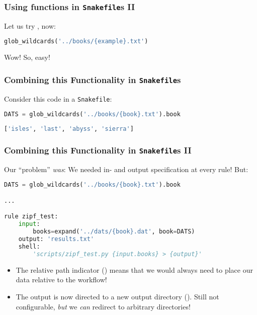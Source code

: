 \begin{frame}[fragile]
  \frametitle{Using functions in \texttt{Snakefile}s II}
  \pause
  \pause
  Let us try , now:
  \begin{lstlisting}[language=Python,style=Python]
glob_wildcards('../books/{example}.txt')
  \end{lstlisting}
  \pause
  Wow! So, easy!
\end{frame}

\begin{frame}[fragile]
  \frametitle{Combining this Functionality in \texttt{Snakefile}s}
  Consider this code in a \texttt{Snakefile}:
  \begin{lstlisting}[language=Python,style=Python]
DATS = glob_wildcards('../books/{book}.txt').book
  \end{lstlisting}
  \pause
  \begin{lstlisting}[language=Python,style=Python]
['isles', 'last', 'abyss', 'sierra']
  \end{lstlisting}
\end{frame}

\begingroup
{}
\begin{frame}[fragile]
  \frametitle{Combining this Functionality in \texttt{Snakefile}s II}\footnotesize
  \vspace{-0.5em}
  Our ``problem'' \emph{was}: We needed in- and output specification at every rule! But:
  \begin{lstlisting}[language=Python,style=Python,basicstyle=\footnotesize]
DATS = glob_wildcards('../books/{book}.txt').book

...

rule zipf_test:
    input:
        books=expand('../dats/{book}.dat', book=DATS)
    output: 'results.txt'
    shell:  
        'scripts/zipf_test.py {input.books} > {output}'
  \end{lstlisting}
  \vspace{-0.5em}
  \pause
  \begin{itemize}[<+->]
   \item The relative path indicator () means that we would always need to place our data relative to the workflow!
   \item The output is now directed to a new output directory (). Still not configurable, \emph{but} we \emph{can} redirect to arbitrary directories!
  \end{itemize}
  \vfill
\end{frame}
\endgroup

